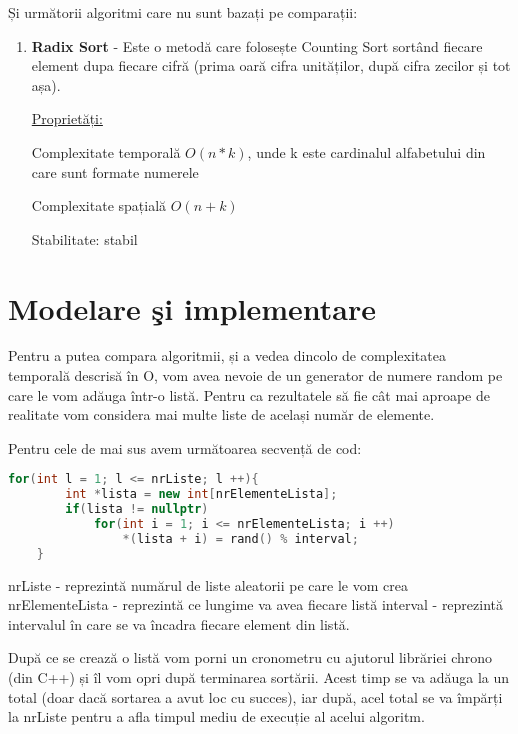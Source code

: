\documentclass[12pt]{article}
\begin{document}
Și următorii algoritmi care nu sunt bazați pe comparații:

\begin{enumerate}
    \item {\bf Radix Sort} - Este o metodă care folosește Counting Sort sortând fiecare element dupa fiecare cifră (prima oară cifra unităților,
     după cifra zecilor și tot așa).

    \underline {Proprietăți:}
    
    Complexitate temporală $O(n * k)$, unde k este cardinalul alfabetului din care sunt formate numerele

    Complexitate spațială $O(n + k)$

    Stabilitate: stabil
\end{enumerate}

\section{Modelare şi implementare}

Pentru a putea compara algoritmii, și a vedea dincolo de complexitatea temporală descrisă în O, vom
avea nevoie de un generator de numere random pe care le vom adăuga într-o listă. Pentru ca rezultatele să
fie cât mai aproape de realitate vom considera mai multe liste de același număr de elemente.\newline

Pentru cele de mai sus avem următoarea secvență de cod:

\begin{lstlisting}[language=C++]
    for(int l = 1; l <= nrListe; l ++){
        int *lista = new int[nrElementeLista];
        if(lista != nullptr)
            for(int i = 1; i <= nrElementeLista; i ++)
                *(lista + i) = rand() % interval;
    }
\end{lstlisting}
nrListe - reprezintă numărul de liste aleatorii pe care le vom crea\newline
nrElementeLista - reprezintă ce lungime va avea fiecare listă\newline
interval - reprezintă intervalul în care se va încadra fiecare element
din listă.\newline

După ce se crează o listă vom porni un cronometru cu ajutorul librăriei chrono (din C++) și îl vom opri
după terminarea sortării. Acest timp se va adăuga la un total (doar dacă sortarea a avut loc cu succes), iar
după, acel total se va împărți la nrListe pentru a afla timpul mediu de execuție al acelui algoritm.
\end{document}
